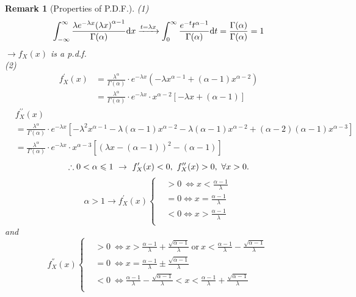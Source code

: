 \documentclass[openany,12pt]{book}
\newtheorem{remark}{Remark}[chapter]
\begin{document}
\begin{remark}[Properties of P.D.F.]
(1)
$$
\int_{-\infty}^{\infty}\frac{\lambda e^{-\lambda x}{(\lambda x)}^{\alpha-1}}{{\Gamma}(\alpha)}\mathrm{d} x\xrightarrow{t=\lambda x}\int_{0}^{\infty}\frac{e^{-t}t^{\alpha-1}}{{\Gamma}(\alpha)}\mathrm{d} t=\frac{{\Gamma}(\alpha)}{{\Gamma}(\alpha)}=1
$$
$\to f_X(x)$ is a p.d.f.\\
(2) 
$$\begin{aligned}
f_X^\prime(x)&=\frac{\lambda^\alpha}{{\Gamma}(\alpha)}\cdot e^{-\lambda x}\left(-\lambda x^{\alpha-1}+\left(\alpha-1\right)x^{\alpha-2}\right)\\
&=\frac{\lambda^\alpha}{{\Gamma}(\alpha)}\cdot e^{-\lambda x}\cdot x^{\alpha-2}\left[-\lambda x+\left(\alpha-1\right)\right]
\end{aligned}$$
$$\begin{aligned}
&f_X^{\prime\prime}(x)\\
&=\frac{\lambda^\alpha}{{\Gamma}(\alpha)}\cdot e^{-\lambda x}\left[-\lambda^2x^{\alpha-1}-\lambda\left(\alpha-1\right)x^{\alpha-2}-\lambda\left(\alpha-1\right)x^{\alpha-2}+(\alpha-2)\left(\alpha-1\right)x^{\alpha-3}\right]\\
&=\frac{\lambda^\alpha}{{\Gamma}(\alpha)}\cdot e^{-\lambda x}\cdot x^{\alpha-3}\left[\left(\lambda x-\left(\alpha-1\right)\right)^2-\left(\alpha-1\right)\right]
\end{aligned}$$
$$
\therefore0<\alpha\ls1\ \to\ f_X^\prime(x)<0,\ f_X^{\prime\prime}(x)>0,\ \forall x>0.
$$
\[\alpha > 1 \to f_{X}^{'}(x)\left\{ \begin{aligned}
 &> 0\  \Leftrightarrow x < \frac{\alpha - 1}{\lambda} \\
 &= 0 \Leftrightarrow x = \frac{\alpha - 1}{\lambda} \\
 &< 0 \Leftrightarrow x > \frac{\alpha - 1}{\lambda} \\
\end{aligned} \right.\ \]
and
\[f_{X}^{''}(x)\left\{ \begin{aligned}
& > 0\  \Leftrightarrow x > \frac{\alpha - 1}{\lambda} + \frac{\sqrt{\alpha - 1}}{\lambda}\ \text{or}\ x < \frac{\alpha - 1}{\lambda} - \frac{\sqrt{\alpha - 1}}{\lambda} \\
 &= 0\  \Leftrightarrow x = \frac{\alpha - 1}{\lambda} \pm \frac{\sqrt{\alpha - 1}}{\lambda} \\
& < 0\  \Leftrightarrow\frac{\alpha - 1}{\lambda} - \frac{\sqrt{\alpha - 1}}{\lambda} < x < \frac{\alpha - 1}{\lambda} + \frac{\sqrt{\alpha - 1}}{\lambda}\\
\end{aligned} \right.\ \]
\end{remark}
\end{document}
